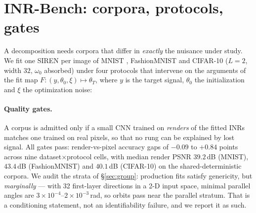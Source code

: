 \documentclass[10pt,twocolumn,letterpaper]{article}
\theoremstyle{definition}
\begin{document}
\section{INR-Bench: corpora, protocols, gates}\label{sec:bench}

A decomposition needs corpora that differ in \emph{exactly} the nuisance under study. We fit one
SIREN per image of MNIST \citep{lecun1998mnist}, FashionMNIST \citep{xiao2017fashion} and CIFAR-10
\citep{krizhevsky2009cifar} ($L=2$, width $32$, $\omega_0$ absorbed) under four protocols that intervene on
the arguments of the fit map $F : (y, \theta_0, \xi) \mapsto \theta_T$, where $y$ is the target
signal, $\theta_0$ the initialization and $\xi$ the optimization noise:

\begin{center}\small
{}
\end{center}

\paragraph{Quality gates.} A corpus is admitted only if a small CNN trained on \emph{renders} of
the fitted INRs matches one trained on real pixels, so that no rung can be explained by lost
signal. All gates pass: render-vs-pixel accuracy gaps of $-0.09$ to $+0.84$ points across nine
dataset$\times$protocol cells, with median render PSNR $39.2$\,dB (MNIST), $43.4$\,dB
(FashionMNIST) and $40.1$\,dB (CIFAR-10) on the shared-deterministic corpora. We audit the strata of
\S\ref{sec:group}: production fits satisfy genericity, but \emph{marginally} --- with 32
first-layer directions in a 2-D input space, minimal parallel angles are
$3\times10^{-4}$--$2\times10^{-3}$\,rad, so orbits pass near the parallel stratum. That is a
conditioning statement, not an identifiability failure, and we report it as such.
\end{document}
